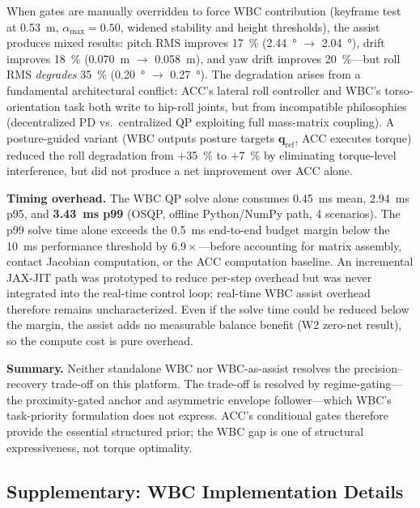 When gates are manually overridden to force WBC contribution (keyframe test at \SI{0.53}{m}, $\alpha_{\max}{=}0.50$, widened stability and height thresholds), the assist produces mixed results:
pitch RMS improves \SI{17}{\percent} (\SI{2.44}{\degree} $\rightarrow$ \SI{2.04}{\degree}), drift improves \SI{18}{\percent} (\SI{0.070}{m} $\rightarrow$ \SI{0.058}{m}), and yaw drift improves \SI{20}{\percent}---but roll RMS \emph{degrades} \SI{35}{\percent} (\SI{0.20}{\degree} $\rightarrow$ \SI{0.27}{\degree}).
The degradation arises from a fundamental architectural conflict:
ACC's lateral roll controller and WBC's torso-orientation task both write to hip-roll joints, but from incompatible philosophies (decentralized PD vs.\ centralized QP exploiting full mass-matrix coupling).
A posture-guided variant (WBC outputs posture targets $\mathbf{q}_{\text{ref}}$, ACC executes torque) reduced the roll degradation from $+$\SI{35}{\percent} to $+$\SI{7}{\percent} by eliminating torque-level interference, but did not produce a net improvement over ACC alone.

\medskip\noindent\textbf{Timing overhead.}
The WBC QP solve alone consumes \SI{0.45}{ms} mean, \SI{2.94}{ms} p95, and \textbf{\SI{3.43}{ms} p99} (OSQP, offline Python/NumPy path, 4 scenarios).
The p99 solve time alone exceeds the \SI{0.5}{ms} end-to-end budget margin below the \SI{10}{ms} performance threshold by $\num{6.9}\times$---before accounting for matrix assembly, contact Jacobian computation, or the ACC computation baseline.
An incremental JAX-JIT path was prototyped to reduce per-step overhead but was never integrated into the real-time control loop; real-time WBC assist overhead therefore remains uncharacterized.
Even if the solve time could be reduced below the margin, the assist adds no measurable balance benefit (W2 zero-net result), so the compute cost is pure overhead.

\medskip\noindent\textbf{Summary.}
Neither standalone WBC nor WBC-as-assist resolves the precision--recovery trade-off on this platform.
The trade-off is resolved by regime-gating---the proximity-gated anchor and asymmetric envelope follower---which WBC's task-priority formulation does not express.
ACC's conditional gates therefore provide the essential structured prior; the WBC gap is one of structural expressiveness, not torque optimality.

\subsection{Supplementary: WBC Implementation Details}
\label{sec:wbc_supp}

